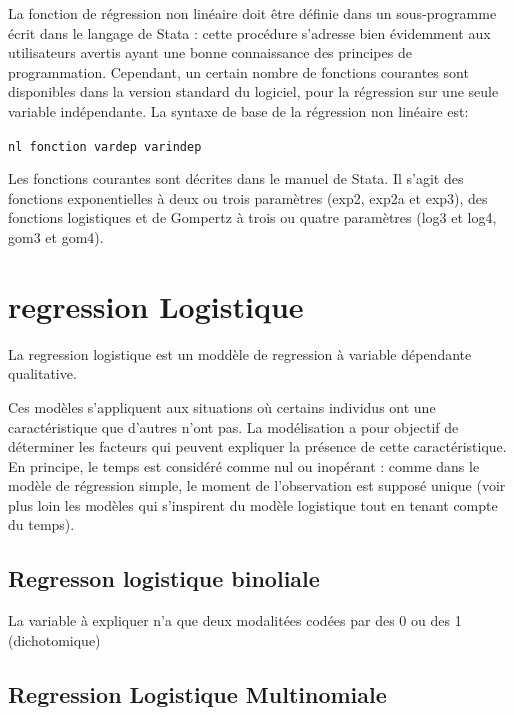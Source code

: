 \documentclass[
]{book}
\begin{document}
La fonction de régression non linéaire doit être définie dans un
sous-programme écrit dans le langage de Stata : cette procédure
s'adresse bien évidemment aux utilisateurs avertis ayant une
bonne connaissance des principes de programmation.
Cependant, un certain nombre de fonctions courantes sont
disponibles dans la version standard du logiciel, pour la
régression sur une seule variable indépendante. La syntaxe de
base de la régression non linéaire est:

\texttt{nl\ fonction\ vardep\ varindep}

Les fonctions courantes sont décrites dans le manuel de Stata. Il
s'agit des fonctions exponentielles à deux ou trois paramètres
(exp2, exp2a et exp3), des fonctions logistiques et de
Gompertz à trois ou quatre paramètres (log3 et log4, gom3 et
gom4).

\hypertarget{regression-logistique}{%
\section{regression Logistique}\label{regression-logistique}}

La regression logistique est un moddèle de regression à variable dépendante qualitative.

Ces modèles s'appliquent aux situations où certains individus
ont une caractéristique que d'autres n'ont pas. La modélisation a
pour objectif de déterminer les facteurs qui peuvent expliquer la
présence de cette caractéristique. En principe, le temps est
considéré comme nul ou inopérant : comme dans le modèle de
régression simple, le moment de l'observation est supposé
unique (voir plus loin les modèles qui s'inspirent du modèle
logistique tout en tenant compte du temps).

\hypertarget{regresson-logistique-binoliale}{%
\subsection{Regresson logistique binoliale}\label{regresson-logistique-binoliale}}

La variable à expliquer n'a que deux modalitées codées par des 0 ou des 1 (dichotomique)

\hypertarget{regression-logistique-multinomiale}{%
\subsection{Regression Logistique Multinomiale}\label{regression-logistique-multinomiale}}
\end{document}
